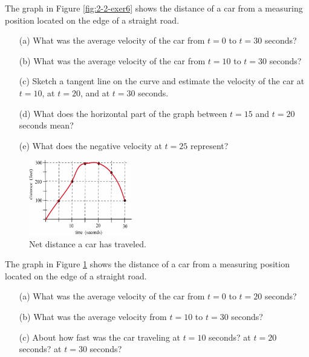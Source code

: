 \begin{enumerate}
\begin{minipage}{\linewidth}
\item	The graph in Figure \ref{fig:2-2-exer6} shows the distance of a car from a measuring position located on the edge of a straight road.
    \begin{itemize}
    \item[(a)]	 What was the average velocity of the car from  $t = 0$  to  $t = 30$ seconds?
    \item[(b)]	What was the average velocity of the car from  $t = 10$  to  $t = 30$ seconds?
    \item[(c)]	Sketch a tangent line on the curve and estimate the velocity of the car at  $t = 10$, at $t = 20$, and at $t = 30$ seconds.
    \item[(d)]	What does the horizontal part of the graph between  $t = 15$  and  $t = 20$ seconds mean?
    \item[(e)]	What does the negative velocity at  $t = 25$  represent?
    \end{itemize}
\end{minipage}

\begin{minipage}{\linewidth}
\begin{figure}
    \centering
    \vspace{-12pt}
    \includegraphics[width=0.4\textwidth]{img/chap2/image009.png}
    \caption{Net distance a car has traveled.}
    \label{fig:2-2-exer7}
\end{figure}

\item	The graph in Figure \ref{fig:2-2-exer7} shows the distance of a car from a measuring position located on the edge of a straight road.
    \begin{itemize}
    \item[(a)]	What was the average velocity of the car from  $t = 0$  to  $t = 20$ seconds?
    \item[(b)]	What was the average velocity from  $t = 10$  to  $t = 30$ seconds?
    \item[(c)]	About how fast was the car traveling at  $t = 10$ 
		seconds?  at  $t = 20$ seconds?  at  $t = 30$ seconds?
    \end{itemize}
\end{minipage}


\end{enumerate}
